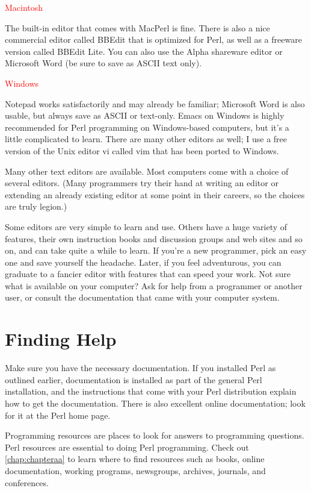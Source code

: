 \textcolor{red}{Macintosh}
\begin{adjustwidth}{1cm}{}
The built-in editor that comes with MacPerl is fine. There is also a nice commercial editor called BBEdit that is optimized for Perl, as well as a freeware version called BBEdit Lite. You can also use the Alpha shareware editor or Microsoft Word (be sure to save as ASCII text only).
\end{adjustwidth}

\textcolor{red}{Windows}
\begin{adjustwidth}{1cm}{}
Notepad works satisfactorily and may already be familiar; Microsoft Word is also usable, but always save as ASCII or text-only. Emacs on Windows is highly recommended for Perl programming on Windows-based computers, but it's a little complicated to learn. There are many other editors as well; I use a free version of the Unix editor vi called vim that has been ported to Windows.
\end{adjustwidth}

Many other text editors are available. Most computers come with a choice of several editors. (Many programmers try their hand at writing an editor or extending an already existing editor at some point in their careers, so the choices are truly legion.)

Some editors are very simple to learn and use. Others have a huge variety of features, their own instruction books and discussion groups and web sites and so on, and can take quite a while to learn. If you're a new programmer, pick an easy one and save yourself the headache. Later, if you feel adventurous, you can graduate to a fancier editor with features that can speed your work. Not sure what is available on your computer? Ask for help from a programmer or another user, or consult the documentation that came with your computer system. 

\section{Finding Help}
Make sure you have the necessary documentation. If you installed Perl as outlined earlier, documentation is installed as part of the general Perl installation, and the instructions that come with your Perl distribution explain how to get the documentation. There is also excellent online documentation; look for it at the Perl home page.

Programming resources are places to look for answers to programming questions. Perl resources are essential to doing Perl programming. Check out \ref{chap:chapteraa} to learn where to find resources such as books, online documentation, working programs, newsgroups, archives, journals, and conferences.

